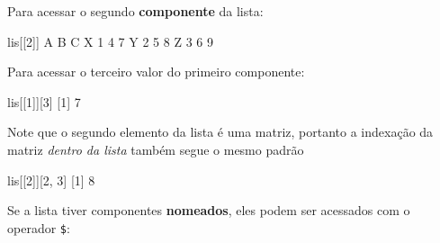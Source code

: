 \documentclass[10pt,a4paper]{book}
\newenvironment{Shaded}{\begin{snugshade}}{\end{snugshade}}
\newcommand{\KeywordTok}[1]{\textcolor[rgb]{0.13,0.29,0.53}{\textbf{#1}}}
\newcommand{\DataTypeTok}[1]{\textcolor[rgb]{0.13,0.29,0.53}{#1}}
\newcommand{\DecValTok}[1]{\textcolor[rgb]{0.00,0.00,0.81}{#1}}
\newcommand{\StringTok}[1]{\textcolor[rgb]{0.31,0.60,0.02}{#1}}
\newcommand{\OperatorTok}[1]{\textcolor[rgb]{0.81,0.36,0.00}{\textbf{#1}}}
\newcommand{\NormalTok}[1]{#1}
\begin{document}
Para acessar o segundo \textbf{componente} da lista:

\begin{Shaded}
\begin{Highlighting}[]
\NormalTok{lis[[}\DecValTok{2}\NormalTok{]]}
\NormalTok{  A B C}
\NormalTok{X }\DecValTok{1} \DecValTok{4} \DecValTok{7}
\NormalTok{Y }\DecValTok{2} \DecValTok{5} \DecValTok{8}
\NormalTok{Z }\DecValTok{3} \DecValTok{6} \DecValTok{9}
\end{Highlighting}
\end{Shaded}

Para acessar o terceiro valor do primeiro componente:

\begin{Shaded}
\begin{Highlighting}[]
\NormalTok{lis[[}\DecValTok{1}\NormalTok{]][}\DecValTok{3}\NormalTok{]}
\NormalTok{[}\DecValTok{1}\NormalTok{] }\DecValTok{7}
\end{Highlighting}
\end{Shaded}

Note que o segundo elemento da lista é uma matriz, portanto a indexação
da matriz \emph{dentro da lista} também segue o mesmo padrão

\begin{Shaded}
\begin{Highlighting}[]
\NormalTok{lis[[}\DecValTok{2}\NormalTok{]][}\DecValTok{2}\NormalTok{, }\DecValTok{3}\NormalTok{]}
\NormalTok{[}\DecValTok{1}\NormalTok{] }\DecValTok{8}
\end{Highlighting}
\end{Shaded}

Se a lista tiver componentes \textbf{nomeados}, eles podem ser acessados
com o operador \texttt{\$}:

\begin{Shaded}
\end{Shaded}
\end{document}
